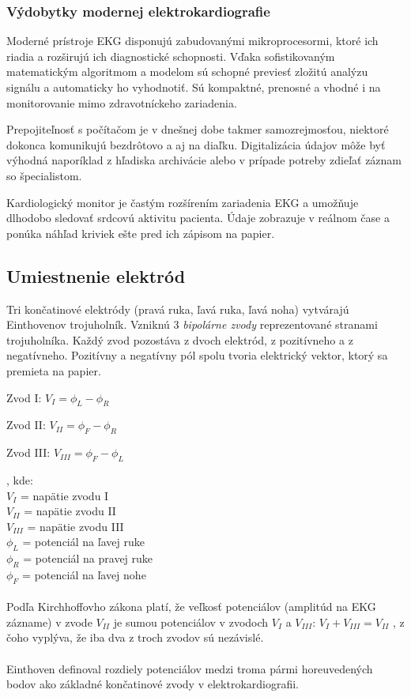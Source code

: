 \documentclass[titlepage]{article}
\begin{document}
\subsubsection{Výdobytky modernej elektrokardiografie}
Moderné prístroje EKG disponujú zabudovanými mikroprocesormi, ktoré ich riadia a rozširujú ich diagnostické schopnosti. Vďaka sofistikovaným matematickým algoritmom a modelom sú schopné previesť zložitú analýzu signálu a automaticky ho vyhodnotiť. Sú kompaktné, prenosné a vhodné i na monitorovanie mimo zdravotníckeho zariadenia.

Prepojiteľnosť s počítačom je v dnešnej dobe takmer samozrejmosťou, niektoré dokonca komunikujú bezdrôtovo a aj na diaľku. Digitalizácia údajov môže byť výhodná naporíklad z hľadiska archivácie alebo v prípade potreby zdieľať záznam so špecialistom.

Kardiologický monitor je častým rozšírením zariadenia EKG a umožňuje dlhodobo sledovať srdcovú aktivitu pacienta. Údaje zobrazuje v reálnom čase a ponúka náhľad kriviek ešte pred ich zápisom na papier.


\newpage

\subsection{Umiestnenie elektród}
Tri končatinové elektródy (pravá ruka, ľavá ruka, ľavá noha)  vytvárajú Einthovenov trojuholník. Vzniknú 3 \emph{bipolárne zvody} reprezentované stranami trojuholníka. Každý zvod pozostáva z dvoch elektród, z pozitívneho a z negatívneho. Pozitívny a negatívny pól spolu tvoria elektrický vektor, ktorý sa premieta na papier.

\begin{description}
	\item Zvod I: \tabto{1cm} $V_{I} = \phi_L - \phi_R$
	\item Zvod II: \tabto{1cm} $V_{II} = \phi_F - \phi_R$
	\item Zvod III:	\tabto{1cm} $V_{III} = \phi_F - \phi_L$
\end{description}
, kde: \\
\tabto{1cm} $V_{I}$ = napätie zvodu I\\
\tabto{1cm} $V_{II}$ = napätie zvodu II\\
\tabto{1cm} $V_{III}$ = napätie zvodu III\\
\tabto{1cm} $\phi_L$ = potenciál na ľavej ruke\\
\tabto{1cm} $\phi_R$ = potenciál na pravej ruke\\
\tabto{1cm} $\phi_F$ = potenciál na ľavej nohe\\
\\
Podľa Kirchhoffovho zákona platí, že veľkosť potenciálov (amplitúd na EKG zázname) v zvode $V_{II}$ je sumou potenciálov v zvodoch $V_{I}$ a  $V_{III}$:
\tabto{1cm} $V_{I} + V_{III} = V_{II}$
, z čoho vyplýva, že iba dva z troch zvodov sú nezávislé.
\\
\\
Einthoven definoval rozdiely potenciálov medzi troma pármi horeuvedených bodov ako základné končatinové zvody v elektrokardiografii.
\end{document}

